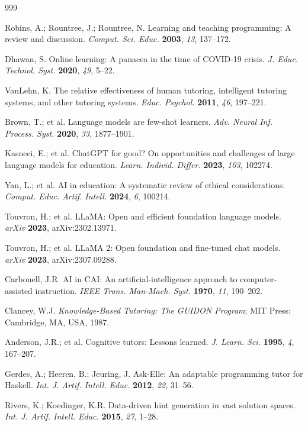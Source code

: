 \documentclass[journal,article,submit,pdftex,moreauthors]{Definitions/mdpi}
\begin{document}
\begin{thebibliography}{999}

Robins, A.; Rountree, J.; Rountree, N. Learning and teaching programming: A review and discussion. \textit{Comput. Sci. Educ.} \textbf{2003}, \textit{13}, 137--172.

Dhawan, S. Online learning: A panacea in the time of COVID-19 crisis. \textit{J. Educ. Technol. Syst.} \textbf{2020}, \textit{49}, 5--22.

VanLehn, K. The relative effectiveness of human tutoring, intelligent tutoring systems, and other tutoring systems. \textit{Educ. Psychol.} \textbf{2011}, \textit{46}, 197--221.

Brown, T.; et al. Language models are few-shot learners. \textit{Adv. Neural Inf. Process. Syst.} \textbf{2020}, \textit{33}, 1877--1901.

Kasneci, E.; et al. ChatGPT for good? On opportunities and challenges of large language models for education. \textit{Learn. Individ. Differ.} \textbf{2023}, \textit{103}, 102274.

Yan, L.; et al. AI in education: A systematic review of ethical considerations. \textit{Comput. Educ. Artif. Intell.} \textbf{2024}, \textit{6}, 100214.

Touvron, H.; et al. LLaMA: Open and efficient foundation language models. \textit{arXiv} \textbf{2023}, arXiv:2302.13971.

Touvron, H.; et al. LLaMA 2: Open foundation and fine-tuned chat models. \textit{arXiv} \textbf{2023}, arXiv:2307.09288.

Carbonell, J.R. AI in CAI: An artificial-intelligence approach to computer-assisted instruction. \textit{IEEE Trans. Man-Mach. Syst.} \textbf{1970}, \textit{11}, 190--202.

Clancey, W.J. \textit{Knowledge-Based Tutoring: The GUIDON Program}; MIT Press: Cambridge, MA, USA, 1987.

Anderson, J.R.; et al. Cognitive tutors: Lessons learned. \textit{J. Learn. Sci.} \textbf{1995}, \textit{4}, 167--207.

Gerdes, A.; Heeren, B.; Jeuring, J. Ask-Elle: An adaptable programming tutor for Haskell. \textit{Int. J. Artif. Intell. Educ.} \textbf{2012}, \textit{22}, 31--56.

Rivers, K.; Koedinger, K.R. Data-driven hint generation in vast solution spaces. \textit{Int. J. Artif. Intell. Educ.} \textbf{2015}, \textit{27}, 1--28.


\end{thebibliography}
\end{document}

